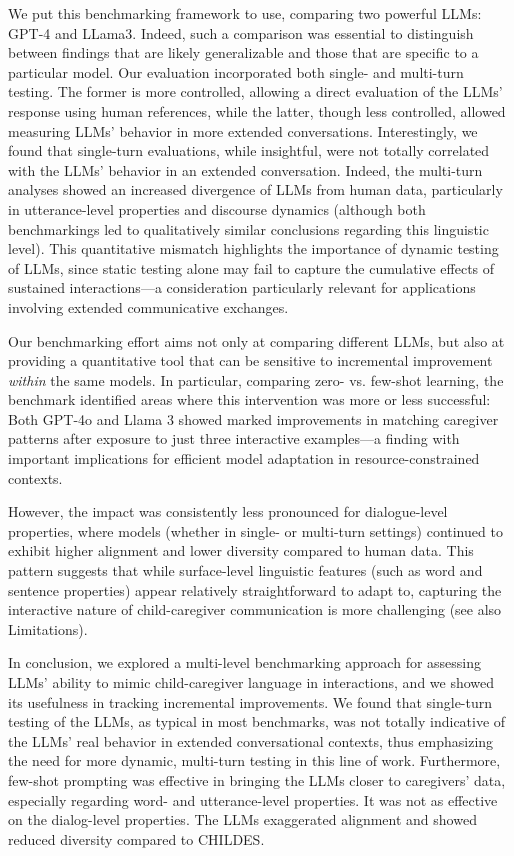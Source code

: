 We put this benchmarking framework to use, comparing two powerful LLMs: GPT-4 and LLama3. Indeed, such a comparison was essential to distinguish between findings that are likely generalizable and those that are specific to a particular model. Our evaluation incorporated both single- and multi-turn testing. The former is more controlled, allowing a direct evaluation of the LLMs' response using human references, while the latter, though less controlled, allowed measuring LLMs' behavior in more extended conversations. Interestingly, we found that single-turn evaluations, while insightful, were not totally correlated with the LLMs' behavior in an extended conversation. Indeed, the multi-turn analyses showed an increased divergence of LLMs from human data, particularly in utterance-level properties and discourse dynamics (although both benchmarkings led to qualitatively similar conclusions regarding this linguistic level). This quantitative mismatch highlights the importance of dynamic testing of LLMs, since static testing alone may fail to capture the cumulative effects of sustained interactions---a consideration particularly relevant for applications involving extended communicative exchanges.


Our benchmarking effort aims not only at comparing different LLMs, but also at providing a quantitative tool that can be sensitive to incremental improvement \textit{within} the same models. In particular, comparing zero- vs. few-shot learning, the benchmark identified areas where this intervention was more or less successful: Both GPT-4o and Llama 3 showed marked improvements in matching caregiver patterns after exposure to just three interactive examples---a finding with important implications for efficient model adaptation in resource-constrained contexts. 

However, the impact was consistently less pronounced for dialogue-level properties, where models (whether in single- or multi-turn settings) continued to exhibit higher alignment and lower diversity compared to human data. This pattern suggests that while surface-level linguistic features (such as word and sentence properties) appear relatively straightforward to adapt to, capturing the interactive nature of child-caregiver communication is more challenging (see also Limitations).

In conclusion, we explored a multi-level benchmarking approach for assessing LLMs' ability to mimic child-caregiver language in interactions, and we showed its usefulness in tracking incremental improvements. We found that single-turn testing of the LLMs, as typical in most benchmarks, was not totally indicative of the LLMs' real behavior in extended conversational contexts, thus emphasizing the need for more dynamic, multi-turn testing in this line of work. Furthermore, few-shot prompting was effective in bringing the LLMs closer to caregivers' data, especially regarding word- and utterance-level properties. It was not as effective on the dialog-level properties. The LLMs exaggerated alignment and showed reduced diversity compared to CHILDES. 



